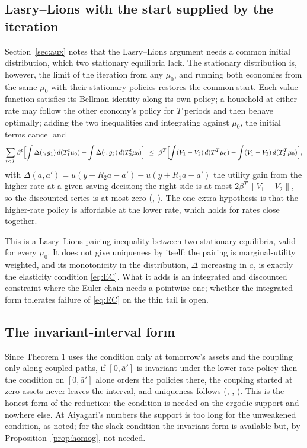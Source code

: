 \subsection{Lasry--Lions with the start supplied by the iteration}\label{sec:lliter}

Section~\ref{sec:aux} notes that the Lasry--Lions argument needs a common initial distribution,
which two stationary equilibria lack. The stationary distribution is, however, the limit of the
iteration from any $\mu_0$, and running both economies from the same $\mu_0$ with their stationary
policies restores the common start. Each value function satisfies its Bellman identity along its
own policy; a household at either rate may follow the other economy's policy for $T$ periods and
then behave optimally; adding the two inequalities and integrating against $\mu_0$, the initial
terms cancel and
\begin{equation}\label{eq:lliter}
  \sum_{t<T}\beta^t\Bigl[\int\Delta(\cdot,g_1)\,d(T_1^t\mu_0)-\int\Delta(\cdot,g_2)\,d(T_2^t\mu_0)\Bigr]
  \ \le\ \beta^T\Bigl[\int(V_1-V_2)\,d(T_1^T\mu_0)-\int(V_1-V_2)\,d(T_2^T\mu_0)\Bigr],
\end{equation}
with $\Delta(a,a')=u(y+R_2a-a')-u(y+R_1a-a')$ the utility gain from the higher rate at a given
saving decision; the right side is at most $2\beta^T\|V_1-V_2\|$, so the discounted series is at
most zero (, ). The
one extra hypothesis is that the higher-rate policy is affordable at the lower rate, which holds
for rates close together.

This is a Lasry--Lions pairing inequality between two stationary equilibria, valid for every
$\mu_0$. It does not give uniqueness by itself: the pairing is marginal-utility weighted, and
its monotonicity in the distribution, $\Delta$ increasing in $a$, is exactly the elasticity
condition \eqref{eq:EC}. What it adds is an integrated and discounted constraint where the Euler
chain needs a pointwise one; whether the integrated form tolerates failure of \eqref{eq:EC} on
the thin tail is open.

\subsection{The invariant-interval form}\label{sec:invariant}

Since Theorem 1 uses the condition only at tomorrow's assets and the coupling only along coupled
paths, if $[0,\bar a']$ is invariant under the lower-rate policy then the condition on $[0,\bar a']$
alone orders the policies there, the coupling started at zero assets never leaves the interval, and
uniqueness follows (, ,
). This is the honest form of the reduction: the
condition is needed on the ergodic support and nowhere else. At Aiyagari's numbers the support is
too long for the unweakened condition, as noted; for the slack condition the invariant form is
available but, by Proposition~\ref{prop:homog}, not needed.

